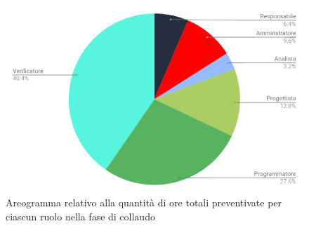 \begin{figure}[h!]
	\caption{Areogramma relativo alla quantità di ore totali preventivate per ciascun ruolo nella fase di collaudo}
    \includegraphics[width=1\textwidth]{./src/Preventivo/src/img/TortaValidazione.png}  
\end{figure}

